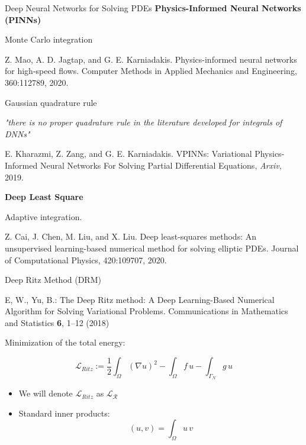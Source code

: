 \begin{frame}[t]{Deep Neural Networks for Solving PDEs}
\textbf{Physics-Informed Neural Networks (PINNs)}

Monte Carlo integration
\begin{thebibliography}{2}
 {\small Z. Mao, A. D. Jagtap, and G. E. Karniadakis. Physics-informed neural networks for high-speed flows. Computer Methods in Applied Mechanics and Engineering, 360:112789, 2020.}
\end{thebibliography}
Gaussian quadrature rule

\textit{"there is no proper quadrature rule in the literature developed for integrals of DNNs"}
\begin{thebibliography}{2}
 {\small E. Kharazmi, Z. Zang, and G. E. Karniadakis. VPINNs: Variational Physics-Informed Neural Networks For Solving Partial Differential Equations, \textit{Arxiv}, 2019.}
\end{thebibliography}

\textbf{Deep Least Square}

Adaptive integration.
\begin{thebibliography}{3}
 {\small Z. Cai, J. Chen, M. Liu, and X. Liu. Deep least-squares methods: An unsupervised learning-based numerical method for solving elliptic PDEs.
Journal of Computational Physics, 420:109707, 2020.}
\end{thebibliography}
\end{frame}




\begin{frame} {Deep Ritz Method (DRM)}
\vspace{-0.2cm}
\begin{thebibliography}{1}
E, W., Yu, B.: The Deep Ritz method: A Deep Learning-Based Numerical Algorithm for Solving Variational Problems. Communications in Mathematics and Statistics \textbf{6}, 1--12 (2018)
\end{thebibliography}
\vspace{0.3cm}

Minimization of the total energy:

\begin{equation*}
 \mathcal{L}_{Ritz}  := \frac{1}{2} \int_{\Omega} (\nabla u )^2 - \int_{\Omega} f \, u - \int_{\Gamma_N }g \, u
\end{equation*}

\begin{itemize}
\item We will denote $\mathcal{L}_{Ritz}$ as $\mathcal{L}_{\mathcal{R}}$
\item Standard inner products:
\begin{equation*}
(u,v) = \int_{\Omega} u \, v
\end{equation*}
\end{itemize}
\end{frame}


